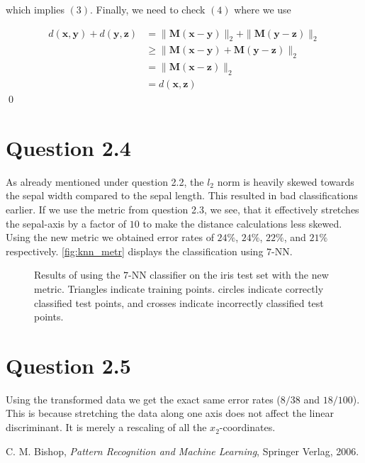 \documentclass[11pt,a4paper]{article}
\begin{document}
which implies $(3)$. Finally, we need to check $(4)$ where we use

\begin{align*}
d(\bm{x}, \bm{y}) + 
d(\bm{y}, \bm{z}) &= \| \bm{M}(\bm{x} - \bm{y}) \|_{2} + \| \bm{M}(\bm{y} - \bm{z}) \|_{2} \\
                  &\geq \| \bm{M}(\bm{x} - \bm{y}) +  \bm{M}(\bm{y} - \bm{z}) \|_{2} \tag{per 8}\\
                  &= \| \bm{M}(\bm{x} - \bm{z}) \|_{2} \\
                  &= d(\bm{x},\bm{z})
\end{align*}
\qed


\section{Question 2.4}
As already mentioned under question 2.2, the $l_2$ norm is heavily skewed
towards the sepal width compared to the sepal length. This resulted in bad
classifications earlier. If we use the metric from question 2.3, we see, that
it effectively stretches the sepal-axis by a factor of $10$ to make the
distance calculations less skewed. Using the new metric we obtained error rates
of $24\%$, $24\%$, $22\%$, and $21\%$ respectively. \autoref{fig:knn_metr}
displays the classification using $7$-NN.

\begin{figure}[htbp]
    \centering
    \caption{Results of using the $7$-NN classifier on the iris test set with
    the new metric. Triangles indicate training points. circles indicate
    correctly classified test points, and crosses indicate incorrectly classified
    test points.}
    \label{fig:knn_metr}
\end{figure}

\section{Question 2.5}
Using the transformed data we get the exact same error rates ($8/38$ and
$18/100$). This is because stretching the data along one axis does not affect
the linear discriminant. It is merely a rescaling of all the $x_2$-coordinates.



\begin{thebibliography}{9}
        C. M. Bishop,
        \emph{Pattern Recognition and Machine Learning},
        Springer Verlag,
        2006.
\end{thebibliography}
\end{document}
